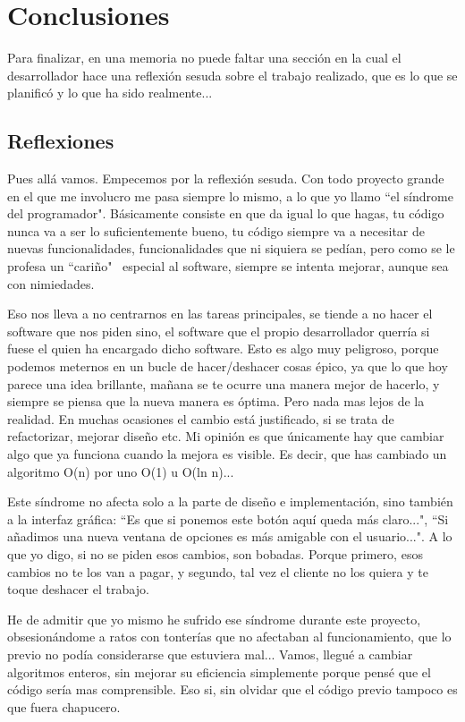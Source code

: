 \section{Conclusiones}
Para finalizar, en una memoria no puede faltar una secci\'on en la cual el desarrollador
hace una reflexi\'on sesuda sobre el trabajo realizado, que es lo que se planific\'o
y lo que ha sido realmente...

\subsection{Reflexiones}
Pues all\'a vamos. Empecemos por la reflexi\'on sesuda.
Con todo proyecto grande en el que me involucro me pasa siempre lo mismo, a lo que yo llamo
``el  s\'indrome del programador". B\'asicamente consiste en que da igual lo que hagas,
tu c\'odigo nunca va a ser lo suficientemente bueno, tu c\'odigo siempre va a necesitar
de nuevas funcionalidades, funcionalidades que ni siquiera se ped\'ian, pero como se le profesa
un ``cari\~no" \ especial al software, siempre se intenta mejorar, aunque sea con nimiedades.

Eso nos lleva a no centrarnos en las tareas principales, se tiende a no hacer el software que nos piden
sino, el software que el propio desarrollador querr\'ia si fuese el quien ha encargado dicho software.
Esto es algo muy peligroso, porque podemos meternos en un bucle de hacer/deshacer cosas \'epico, ya que
lo que hoy parece una idea brillante, ma\~nana se te ocurre una manera mejor de hacerlo, y siempre
se piensa que la nueva manera es \'optima. Pero nada mas lejos de la realidad. En muchas ocasiones el
cambio est\'a justificado, si se trata de refactorizar, mejorar dise\~no etc. Mi opini\'on es que \'unicamente
hay que cambiar algo que ya funciona cuando la mejora es visible. Es decir, que has cambiado un algoritmo O(n)
por uno O(1) u O(ln n)...

Este s\'indrome no afecta solo a la parte de dise\~no e implementaci\'on, sino tambi\'en a la interfaz gr\'afica:
``Es que si ponemos este bot\'on aqu\'i queda m\'as claro...", ``Si a\~nadimos una nueva ventana de opciones es m\'as
amigable con el usuario...". A lo que yo digo, si no se piden esos cambios, son bobadas. Porque primero, esos cambios
no te los van a pagar, y segundo, tal vez el cliente no los quiera y te toque deshacer el trabajo.

He de admitir que yo mismo he sufrido ese s\'indrome durante este proyecto, obsesion\'andome a ratos con tonter\'ias
que no afectaban al funcionamiento, que lo previo no pod\'ia considerarse que estuviera mal... Vamos, llegu\'e a cambiar
algoritmos enteros, sin mejorar su eficiencia simplemente porque pens\'e que el c\'odigo ser\'ia mas comprensible. Eso si,
sin olvidar que el c\'odigo previo tampoco es que fuera chapucero.

